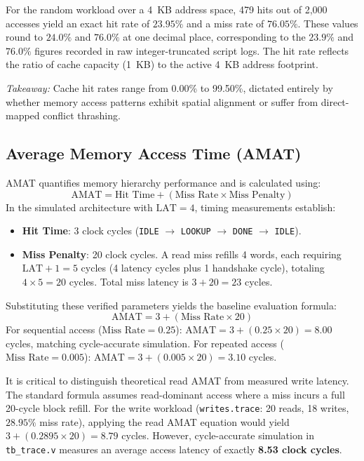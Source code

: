\documentclass[conference]{IEEEtran}
\begin{document}
For the random workload over a 4~KB address space, 479 hits out of 2,000 accesses yield an exact hit rate of $23.95\%$ and a miss rate of $76.05\%$. These values round to $24.0\%$ and $76.0\%$ at one decimal place, corresponding to the $23.9\%$ and $76.0\%$ figures recorded in raw integer-truncated script logs. The hit rate reflects the ratio of cache capacity (1~KB) to the active 4~KB address footprint.

\textit{Takeaway:} Cache hit rates range from 0.00\% to 99.50\%, dictated entirely by whether memory access patterns exhibit spatial alignment or suffer from direct-mapped conflict thrashing.

\subsection{Average Memory Access Time (AMAT)}
AMAT quantifies memory hierarchy performance and is calculated using:
\begin{equation}
    \text{AMAT} = \text{Hit Time} + (\text{Miss Rate} \times \text{Miss Penalty})
\end{equation}
In the simulated architecture with $\text{LAT}=4$, timing measurements establish:
\begin{itemize}
    \item \textbf{Hit Time}: 3 clock cycles (\texttt{IDLE} $\rightarrow$ \texttt{LOOKUP} $\rightarrow$ \texttt{DONE} $\rightarrow$ \texttt{IDLE}).
    \item \textbf{Miss Penalty}: 20 clock cycles. A read miss refills 4 words, each requiring $\text{LAT}+1 = 5$ cycles (4 latency cycles plus 1 handshake cycle), totaling $4 \times 5 = 20$ cycles. Total miss latency is $3 + 20 = 23$ cycles.
\end{itemize}
Substituting these verified parameters yields the baseline evaluation formula:
\begin{equation}
    \text{AMAT} = 3 + (\text{Miss Rate} \times 20)
\end{equation}
For sequential access ($\text{Miss Rate} = 0.25$): $\text{AMAT} = 3 + (0.25 \times 20) = 8.00$ cycles, matching cycle-accurate simulation. For repeated access ($\text{Miss Rate} = 0.005$): $\text{AMAT} = 3 + (0.005 \times 20) = 3.10$ cycles.

It is critical to distinguish theoretical read AMAT from measured write latency. The standard formula assumes read-dominant access where a miss incurs a full 20-cycle block refill. For the write workload (\texttt{writes.trace}: 20 reads, 18 writes, $28.95\%$ miss rate), applying the read AMAT equation would yield $3 + (0.2895 \times 20) = 8.79$ cycles. However, cycle-accurate simulation in \texttt{tb\_trace.v} measures an average access latency of exactly \textbf{8.53 clock cycles}.
\end{document}
